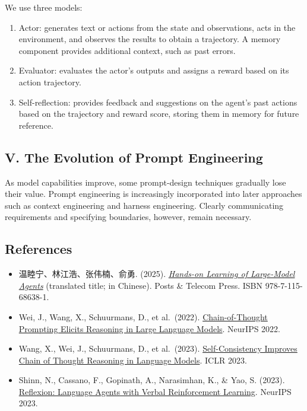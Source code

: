 We use three models:

\begin{enumerate}
\def\labelenumi{(\arabic{enumi})}
\item
  Actor: generates text or actions from the state and observations, acts in the environment, and observes the results to obtain a trajectory. A memory component provides additional context, such as past errors.
\item
  Evaluator: evaluates the actor's outputs and assigns a reward based on its action trajectory.
\item
  Self-reflection: provides feedback and suggestions on the agent's past actions based on the trajectory and reward score, storing them in memory for future reference.
\end{enumerate}

\hypertarget{v.-the-evolution-of-prompt-engineering}{%
\subsection{V. The Evolution of Prompt Engineering}\label{v.-the-evolution-of-prompt-engineering}}

As model capabilities improve, some prompt-design techniques gradually lose their value. Prompt engineering is increasingly incorporated into later approaches such as context engineering and harness engineering. Clearly communicating requirements and specifying boundaries, however, remain necessary.

\FloatBarrier
{}
\hypertarget{references-115}{%
\subsection{References}\label{references-115}}

\vspace{0.25em}
\begin{itemize}
\tightlist
\item
  温睦宁、林江浩、张伟楠、俞勇. (2025). \href{https://haa.boyuai.com/}{\emph{Hands-on Learning of Large-Model Agents}} (translated title; in Chinese). Posts \& Telecom Press. ISBN 978-7-115-68638-1.
\item
  Wei, J., Wang, X., Schuurmans, D., et al.~(2022). \href{https://arxiv.org/abs/2201.11903}{Chain-of-Thought Prompting Elicits Reasoning in Large Language Models}. NeurIPS 2022.
\item
  Wang, X., Wei, J., Schuurmans, D., et al.~(2023). \href{https://openreview.net/forum?id=1PL1NIMMrw}{Self-Consistency Improves Chain of Thought Reasoning in Language Models}. ICLR 2023.
\item
  Shinn, N., Cassano, F., Gopinath, A., Narasimhan, K., \& Yao, S. (2023). \href{https://arxiv.org/abs/2303.11366}{Reflexion: Language Agents with Verbal Reinforcement Learning}. NeurIPS 2023.
\end{itemize}

\clearpage

